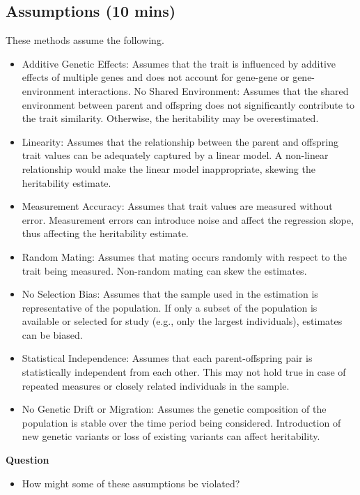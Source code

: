 \documentclass[
  a4paper]{book}
\providecommand{\tightlist}{%
  \setlength{\itemsep}{0pt}\setlength{\parskip}{0pt}}
\begin{document}
\hypertarget{assumptions-10-mins}{%
\subsection{Assumptions (10 mins)}\label{assumptions-10-mins}}

These methods assume the following.

\begin{itemize}
\tightlist
\item
  Additive Genetic Effects: Assumes that the trait is influenced by additive effects of multiple genes and does not account for gene-gene or gene-environment interactions.
  No Shared Environment: Assumes that the shared environment between parent and offspring does not significantly contribute to the trait similarity. Otherwise, the heritability may be overestimated.
\item
  Linearity: Assumes that the relationship between the parent and offspring trait values can be adequately captured by a linear model. A non-linear relationship would make the linear model inappropriate, skewing the heritability estimate.
\item
  Measurement Accuracy: Assumes that trait values are measured without error. Measurement errors can introduce noise and affect the regression slope, thus affecting the heritability estimate.
\item
  Random Mating: Assumes that mating occurs randomly with respect to the trait being measured. Non-random mating can skew the estimates.
\item
  No Selection Bias: Assumes that the sample used in the estimation is representative of the population. If only a subset of the population is available or selected for study (e.g., only the largest individuals), estimates can be biased.
\item
  Statistical Independence: Assumes that each parent-offspring pair is statistically independent from each other. This may not hold true in case of repeated measures or closely related individuals in the sample.
\item
  No Genetic Drift or Migration: Assumes the genetic composition of the population is stable over the time period being considered. Introduction of new genetic variants or loss of existing variants can affect heritability.
\end{itemize}

\textbf{Question}

\begin{itemize}
\tightlist
\item
  How might some of these assumptions be violated?
\end{itemize}
\end{document}
